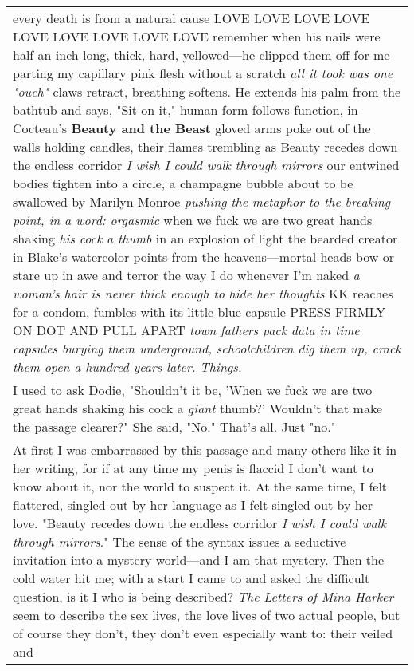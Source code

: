 \begin{longtable}[]{@{}l@{}}
\begin{minipage}[t]{0.97\columnwidth}
every death is from a natural cause LOVE LOVE LOVE LOVE LOVE LOVE LOVE
LOVE LOVE remember when his nails were half an inch long, thick, hard,
yellowed---he clipped them off for me parting my capillary pink flesh
without a scratch \emph{all it took was one "ouch"} claws retract,
breathing softens. He extends his palm from the bathtub and says, "Sit
on it," human form follows function, in Cocteau's \textbf{Beauty and the
Beast} gloved arms poke out of the walls holding candles, their flames
trembling as Beauty recedes down the endless corridor \emph{I wish I
could walk through mirrors} our entwined bodies tighten into a circle, a
champagne bubble about to be swallowed by Marilyn Monroe \emph{pushing
the metaphor to the breaking point, in a word: orgasmic} when we fuck we
are two great hands shaking \emph{his cock a thumb} in an explosion of
light the bearded creator in Blake's watercolor points from the
heavens---mortal heads bow or stare up in awe and terror the way I do
whenever I'm naked \emph{a woman's hair is never thick enough to hide
her thoughts} KK reaches for a condom, fumbles with its little blue
capsule PRESS FIRMLY ON DOT AND PULL APART \emph{town fathers pack data
in time capsules burying them underground, schoolchildren dig them up,
crack them open a hundred years later. Things.}\strut
\end{minipage}\tabularnewline
\begin{minipage}[t]{0.97\columnwidth}\raggedright
I used to ask Dodie, "Shouldn't it be, 'When we fuck we are two great
hands shaking his cock a \emph{giant} thumb?' Wouldn't that make the
passage clearer?" She said, "No." That's all. Just "no."\strut
\end{minipage}\tabularnewline
\begin{minipage}[t]{0.97\columnwidth}\raggedright
At first I was embarrassed by this passage and many others like it in
her writing, for if at any time my penis is flaccid I don't want to know
about it, nor the world to suspect it. At the same time, I felt
flattered, singled out by her language as I felt singled out by her
love. "Beauty recedes down the endless corridor \emph{I wish I could
walk through mirrors}." The sense of the syntax issues a seductive
invitation into a mystery world---and I am that mystery. Then the cold
water hit me; with a start I came to and asked the difficult question,
is it I who is being described? \emph{The Letters of Mina Harker} seem
to describe the sex lives, the love lives of two actual people, but of
course they don't, they don't even especially want to: their veiled and

\end{minipage}
\end{longtable}
